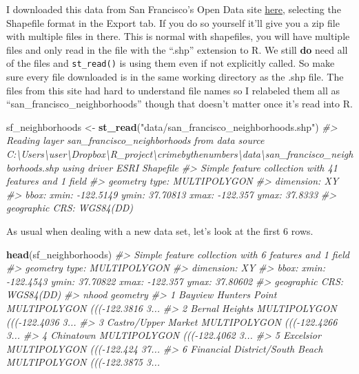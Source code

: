 \documentclass[
  12pt,
]{book}
\newenvironment{Shaded}{\begin{snugshade}}{\end{snugshade}}
\newcommand{\CommentTok}[1]{\textcolor[rgb]{0.56,0.35,0.01}{\textit{#1}}}
\newcommand{\KeywordTok}[1]{\textcolor[rgb]{0.13,0.29,0.53}{\textbf{#1}}}
\newcommand{\NormalTok}[1]{#1}
\newcommand{\StringTok}[1]{\textcolor[rgb]{0.31,0.60,0.02}{#1}}
\begin{document}
I downloaded this data from San Francisco's Open Data site \href{https://data.sfgov.org/Geographic-Locations-and-Boundaries/Analysis-Neighborhoods/p5b7-5n3h}{here}, selecting the Shapefile format in the Export tab. If you do so yourself it'll give you a zip file with multiple files in there. This is normal with shapefiles, you will have multiple files and only read in the file with the ``.shp'' extension to R. We still \textbf{do} need all of the files and \texttt{st\_read()} is using them even if not explicitly called. So make sure every file downloaded is in the same working directory as the .shp file. The files from this site had hard to understand file names so I relabeled them all as ``san\_francisco\_neighborhoods'' though that doesn't matter once it's read into R.

\begin{Shaded}
\begin{Highlighting}[]
\NormalTok{sf\_neighborhoods <{-}}\StringTok{ }\KeywordTok{st\_read}\NormalTok{(}\StringTok{"data/san\_francisco\_neighborhoods.shp"}\NormalTok{)}
\CommentTok{\#> Reading layer \textasciigrave{}san\_francisco\_neighborhoods\textquotesingle{} from data source \textasciigrave{}C:\textbackslash{}Users\textbackslash{}user\textbackslash{}Dropbox\textbackslash{}R\_project\textbackslash{}crimebythenumbers\textbackslash{}data\textbackslash{}san\_francisco\_neighborhoods.shp\textquotesingle{} using driver \textasciigrave{}ESRI Shapefile\textquotesingle{}}
\CommentTok{\#> Simple feature collection with 41 features and 1 field}
\CommentTok{\#> geometry type:  MULTIPOLYGON}
\CommentTok{\#> dimension:      XY}
\CommentTok{\#> bbox:           xmin: {-}122.5149 ymin: 37.70813 xmax: {-}122.357 ymax: 37.8333}
\CommentTok{\#> geographic CRS: WGS84(DD)}
\end{Highlighting}
\end{Shaded}

As usual when dealing with a new data set, let's look at the first 6 rows.

\begin{Shaded}
\begin{Highlighting}[]
\KeywordTok{head}\NormalTok{(sf\_neighborhoods)}
\CommentTok{\#> Simple feature collection with 6 features and 1 field}
\CommentTok{\#> geometry type:  MULTIPOLYGON}
\CommentTok{\#> dimension:      XY}
\CommentTok{\#> bbox:           xmin: {-}122.4543 ymin: 37.70822 xmax: {-}122.357 ymax: 37.80602}
\CommentTok{\#> geographic CRS: WGS84(DD)}
\CommentTok{\#>                            nhood                       geometry}
\CommentTok{\#> 1          Bayview Hunters Point MULTIPOLYGON ((({-}122.3816 3...}
\CommentTok{\#> 2                 Bernal Heights MULTIPOLYGON ((({-}122.4036 3...}
\CommentTok{\#> 3            Castro/Upper Market MULTIPOLYGON ((({-}122.4266 3...}
\CommentTok{\#> 4                      Chinatown MULTIPOLYGON ((({-}122.4062 3...}
\CommentTok{\#> 5                      Excelsior MULTIPOLYGON ((({-}122.424 37...}
\CommentTok{\#> 6 Financial District/South Beach MULTIPOLYGON ((({-}122.3875 3...}
\end{Highlighting}
\end{Shaded}
\end{document}
